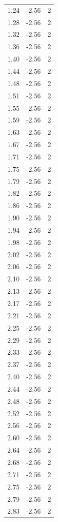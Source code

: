 \begin{longtable}{lrr}
  1.24 & -2.56 & 2 \\
  1.28 & -2.56 & 2 \\
  1.32 & -2.56 & 2 \\
  1.36 & -2.56 & 2 \\
  1.40 & -2.56 & 2 \\
  1.44 & -2.56 & 2 \\
  1.48 & -2.56 & 2 \\
  1.51 & -2.56 & 2 \\
  1.55 & -2.56 & 2 \\
  1.59 & -2.56 & 2 \\
  1.63 & -2.56 & 2 \\
  1.67 & -2.56 & 2 \\
  1.71 & -2.56 & 2 \\
  1.75 & -2.56 & 2 \\
  1.79 & -2.56 & 2 \\
  1.82 & -2.56 & 2 \\
  1.86 & -2.56 & 2 \\
  1.90 & -2.56 & 2 \\
  1.94 & -2.56 & 2 \\
  1.98 & -2.56 & 2 \\
  2.02 & -2.56 & 2 \\
  2.06 & -2.56 & 2 \\
  2.10 & -2.56 & 2 \\
  2.13 & -2.56 & 2 \\
  2.17 & -2.56 & 2 \\
  2.21 & -2.56 & 2 \\
  2.25 & -2.56 & 2 \\
  2.29 & -2.56 & 2 \\
  2.33 & -2.56 & 2 \\
  2.37 & -2.56 & 2 \\
  2.40 & -2.56 & 2 \\
  2.44 & -2.56 & 2 \\
  2.48 & -2.56 & 2 \\
  2.52 & -2.56 & 2 \\
  2.56 & -2.56 & 2 \\
  2.60 & -2.56 & 2 \\
  2.64 & -2.56 & 2 \\
  2.68 & -2.56 & 2 \\
  2.71 & -2.56 & 2 \\
  2.75 & -2.56 & 2 \\
  2.79 & -2.56 & 2 \\
  2.83 & -2.56 & 2 \\

\end{longtable}
